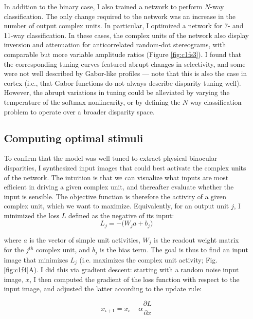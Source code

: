 In addition to the binary case, I also trained a network to perform $N$-way classification. The only change required to the network was an increase in the number of output complex units. In particular, I optimized a network for 7- and 11-way classification. In these cases, the complex units of the network also display inversion and attenuation for anticorrelated random-dot stereograms, with comparable but more variable amplitude ratios (Figure \ref{fig:c1fs3}). I found that the corresponding tuning curves featured abrupt changes in selectivity, and some were not well described by Gabor-like profiles --- note that this is also the case in cortex (i.e., that Gabor functions do not always describe disparity tuning well). However, the abrupt variations in tuning could be alleviated by varying the temperature of the $\mathrm{softmax}$ nonlinearity, or by defining the $N$-way classification problem to operate over a broader disparity space.


\subsection*{Computing optimal stimuli}

To confirm that the model was well tuned to extract physical binocular disparities, I synthesized input images that could best activate the complex units of the network. The intuition is that we can visualize what inputs are most efficient in driving a given complex unit, and thereafter evaluate whether the input is sensible. The objective function is therefore the activity of a given complex unit, which we want to maximize. Equivalently, for an output unit $j$, I minimized the loss $L$ defined as the negative of its input:
\begin{equation}
  L_j = - \big( W_j a + b_j \big) 
  \label{eq:OptLoss}
\end{equation}

where $a$ is the vector of simple unit activities, $W_j$ is the readout weight matrix for the $j^{th}$ complex unit, and $b_j$ is the bias term. The goal is thus to find an input image that minimizes $L_j$ (i.e. maximizes the complex unit activity; Fig. \ref{fig:c1f4}A). I did this via gradient descent: starting with a random noise input image, $x$, I then computed the gradient of the loss function with respect to the input image, and adjusted the latter according to the update rule:

\begin{equation}
  x_{i+1} = x_i - \alpha\frac{\partial L}{\partial x}
\end{equation}

